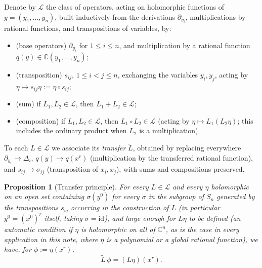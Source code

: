 \documentclass[11pt]{article}
\newtheorem{proposition}[theorem]{Proposition}
\theoremstyle{remark}
\newcommand{\CC}{\mathbb{C}}
\begin{document}
Denote by $\mathcal L$ the class of operators, acting on holomorphic functions of $y=(y_1,\dots,y_n)$, built inductively from the derivations $\partial_{y_i}$, multiplications by rational functions, and transpositions of variables, by:
\begin{itemize}
\item[(i)] (base operators) $\partial_{y_i}$ for $1\le i\le n$, and multiplication by a rational function $q(y)\in\CC(y_1,\dots,y_n)$;
\item[(ii)] (transposition) $s_{ij}$, $1\le i<j\le n$, exchanging the variables $y_i,y_j$, acting by $\eta\mapsto s_{ij}\eta:=\eta\circ s_{ij}$;
\item[(iii)] (sum) if $L_1,L_2\in\mathcal L$, then $L_1+L_2\in\mathcal L$;
\item[(iv)] (composition) if $L_1,L_2\in\mathcal L$, then $L_1\circ L_2\in\mathcal L$ (acting by $\eta\mapsto L_1(L_2\eta)$; this includes the ordinary product when $L_2$ is a multiplication).
\end{itemize}
To each $L\in\mathcal L$ we associate its \emph{transfer} $\widetilde L$, obtained by replacing everywhere $\partial_{y_i}\to\Delta_i$, $q(y)\to q(x^r)$ (multiplication by the transferred rational function), and $s_{ij}\to\sigma_{ij}$ (transposition of $x_i,x_j$), with sums and compositions preserved.

\begin{proposition}[Transfer principle]\label{prop:transfert}
For every $L\in\mathcal L$ and every $\eta$ holomorphic on an open set containing $\sigma(y^0)$ for every $\sigma$ in the subgroup of $S_n$ generated by the transpositions $s_{ij}$ occurring in the construction of $L$ (in particular $y^0=(x^0)^r$ itself, taking $\sigma=\mathrm{id}$), and large enough for $L\eta$ to be defined (an automatic condition if $\eta$ is holomorphic on all of $\CC^n$, as is the case in every application in this note, where $\eta$ is a polynomial or a global rational function), we have, for $\phi:=\eta(x^r)$,
\[
\widetilde L\,\phi = (L\eta)(x^r).
\]
\end{proposition}
\end{document}
